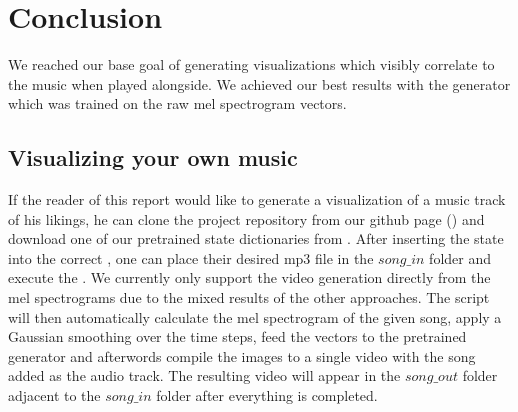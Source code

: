 \chapter{Conclusion}
    We reached our base goal of generating visualizations which visibly correlate to the music when played alongside.
    We achieved our best results with the generator which was trained on the raw mel spectrogram vectors.

    \section{Visualizing your own music}
    If the reader of this report would like to generate a visualization of a music track of his likings, he can clone the project repository from our github page () and download one of our pretrained state dictionaries from . 
    After inserting the state into the correct , one can place their desired mp3 file in the $song\_in$ folder and execute the . 
    We currently only support the video generation directly from the mel spectrograms due to the mixed results of the other approaches.
    The script will then automatically calculate the mel spectrogram of the given song, apply a Gaussian smoothing over the time steps, feed the vectors to the pretrained generator and afterwords compile the images to a single video with the song added as the audio track.
    The resulting video will appear in the $song\_out$ folder adjacent to the $song\_in$ folder after everything is completed.
